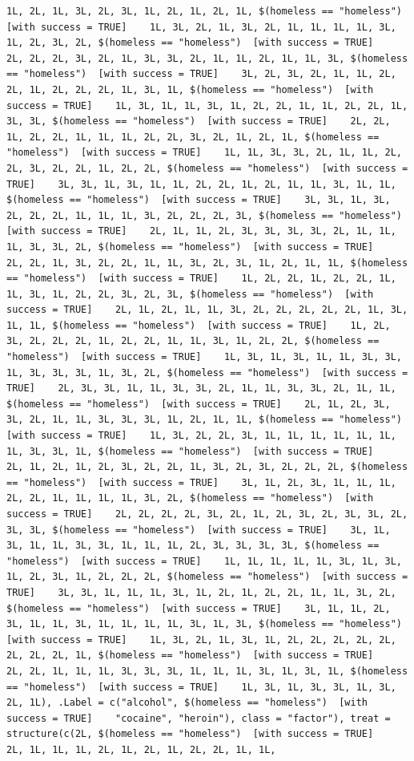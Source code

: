\documentclass{tufte-book}\usepackage[]{graphicx}\usepackage[]{xcolor}
\makeatletter
\newenvironment{kframe}{%
 \def\at@end@of@kframe{}%
 \ifinner\ifhmode%
  \def\at@end@of@kframe{\end{minipage}}%
  \begin{minipage}{\columnwidth}%
 \fi\fi%
 \def\FrameCommand##1{\hskip\@totalleftmargin \hskip-\fboxsep
 \colorbox{shadecolor}{##1}\hskip-\fboxsep
     \hskip-\linewidth \hskip-\@totalleftmargin \hskip\columnwidth}%
 \MakeFramed {\advance\hsize-\width
   \@totalleftmargin\z@ \linewidth\hsize
   \@setminipage}}%
 {\par\unskip\endMakeFramed%
 \at@end@of@kframe}
\newenvironment{knitrout}{}{} %
\makeatother
\begin{document}
\begin{knitrout}
\begin{kframe}
\begin{verbatim}
1L, 2L, 1L, 3L, 2L, 3L, 1L, 2L, 1L, 2L, 1L, $(homeless == "homeless")  [with success = TRUE]    1L, 3L, 2L, 1L, 3L, 2L, 1L, 1L, 1L, 1L, 3L, 1L, 2L, 3L, 2L, $(homeless == "homeless")  [with success = TRUE]    2L, 2L, 2L, 3L, 2L, 1L, 3L, 3L, 2L, 1L, 1L, 2L, 1L, 1L, 3L, $(homeless == "homeless")  [with success = TRUE]    3L, 2L, 3L, 2L, 1L, 1L, 2L, 2L, 1L, 2L, 2L, 2L, 1L, 3L, 1L, $(homeless == "homeless")  [with success = TRUE]    1L, 3L, 1L, 1L, 3L, 1L, 2L, 2L, 1L, 1L, 2L, 2L, 1L, 3L, 3L, $(homeless == "homeless")  [with success = TRUE]    2L, 2L, 1L, 2L, 2L, 1L, 1L, 1L, 2L, 2L, 3L, 2L, 1L, 2L, 1L, $(homeless == "homeless")  [with success = TRUE]    1L, 1L, 3L, 3L, 2L, 1L, 1L, 2L, 2L, 3L, 2L, 2L, 1L, 2L, 2L, $(homeless == "homeless")  [with success = TRUE]    3L, 3L, 1L, 3L, 1L, 1L, 2L, 2L, 1L, 2L, 1L, 1L, 3L, 1L, 1L, $(homeless == "homeless")  [with success = TRUE]    3L, 3L, 1L, 3L, 2L, 2L, 2L, 1L, 1L, 1L, 3L, 2L, 2L, 2L, 3L, $(homeless == "homeless")  [with success = TRUE]    2L, 1L, 1L, 2L, 3L, 3L, 3L, 3L, 2L, 1L, 1L, 1L, 3L, 3L, 2L, $(homeless == "homeless")  [with success = TRUE]    2L, 2L, 1L, 3L, 2L, 2L, 1L, 1L, 3L, 2L, 3L, 1L, 2L, 1L, 1L, $(homeless == "homeless")  [with success = TRUE]    1L, 2L, 2L, 1L, 2L, 2L, 1L, 1L, 3L, 1L, 2L, 2L, 3L, 2L, 3L, $(homeless == "homeless")  [with success = TRUE]    2L, 1L, 2L, 1L, 1L, 3L, 2L, 2L, 2L, 2L, 2L, 1L, 3L, 1L, 1L, $(homeless == "homeless")  [with success = TRUE]    1L, 2L, 3L, 2L, 2L, 2L, 1L, 2L, 2L, 1L, 1L, 3L, 1L, 2L, 2L, $(homeless == "homeless")  [with success = TRUE]    1L, 3L, 1L, 3L, 1L, 1L, 3L, 3L, 1L, 3L, 3L, 3L, 1L, 3L, 2L, $(homeless == "homeless")  [with success = TRUE]    2L, 3L, 3L, 1L, 1L, 3L, 3L, 2L, 1L, 1L, 3L, 3L, 2L, 1L, 1L, $(homeless == "homeless")  [with success = TRUE]    2L, 1L, 2L, 3L, 3L, 2L, 1L, 1L, 3L, 3L, 3L, 1L, 2L, 1L, 1L, $(homeless == "homeless")  [with success = TRUE]    1L, 3L, 2L, 2L, 3L, 1L, 1L, 1L, 1L, 1L, 1L, 1L, 3L, 3L, 1L, $(homeless == "homeless")  [with success = TRUE]    2L, 1L, 2L, 1L, 2L, 3L, 2L, 2L, 1L, 3L, 2L, 3L, 2L, 2L, 2L, $(homeless == "homeless")  [with success = TRUE]    3L, 1L, 2L, 3L, 1L, 1L, 1L, 2L, 2L, 1L, 1L, 1L, 1L, 3L, 2L, $(homeless == "homeless")  [with success = TRUE]    2L, 2L, 2L, 2L, 3L, 2L, 1L, 2L, 3L, 2L, 3L, 3L, 2L, 3L, 3L, $(homeless == "homeless")  [with success = TRUE]    3L, 1L, 3L, 1L, 1L, 3L, 3L, 1L, 1L, 1L, 2L, 3L, 3L, 3L, 3L, $(homeless == "homeless")  [with success = TRUE]    1L, 1L, 1L, 1L, 1L, 3L, 1L, 3L, 1L, 2L, 3L, 1L, 2L, 2L, 2L, $(homeless == "homeless")  [with success = TRUE]    3L, 3L, 1L, 1L, 1L, 3L, 1L, 2L, 1L, 2L, 2L, 1L, 1L, 3L, 2L, $(homeless == "homeless")  [with success = TRUE]    3L, 1L, 1L, 2L, 3L, 1L, 1L, 3L, 1L, 1L, 1L, 1L, 3L, 1L, 3L, $(homeless == "homeless")  [with success = TRUE]    1L, 3L, 2L, 1L, 3L, 1L, 2L, 2L, 2L, 2L, 2L, 2L, 2L, 2L, 1L, $(homeless == "homeless")  [with success = TRUE]    2L, 2L, 1L, 1L, 1L, 3L, 3L, 3L, 1L, 1L, 1L, 3L, 1L, 3L, 1L, $(homeless == "homeless")  [with success = TRUE]    1L, 3L, 1L, 3L, 3L, 1L, 3L, 2L, 1L), .Label = c("alcohol", $(homeless == "homeless")  [with success = TRUE]    "cocaine", "heroin"), class = "factor"), treat = structure(c(2L, $(homeless == "homeless")  [with success = TRUE]    2L, 1L, 1L, 1L, 2L, 1L, 2L, 1L, 2L, 2L, 1L, 1L, 
\end{verbatim}
\end{kframe}
\end{knitrout}
\end{document}
